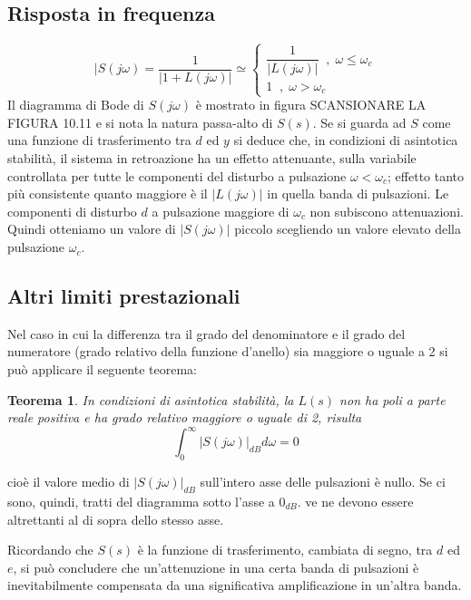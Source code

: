 \documentclass[a4paper]{report}
\newtheorem{teorema}{Teorema}
\begin{document}
\subsection{Risposta in frequenza}
\[
|S(j \omega) = \dfrac{1}{|1 + L(j \omega)|} \simeq
\left\{
\begin{array}{l}
  \dfrac{1}{|L(j \omega)|} \;\;,\; \omega \leq \omega_c\\
  1 \;\;,\; \omega > \omega_c
\end{array}
\right.
\]
Il diagramma di Bode di $S(j\omega)$ \`e mostrato in figura SCANSIONARE LA
FIGURA 10.11 e si nota la natura passa-alto di $S(s)$. Se si guarda ad
$S$ come una funzione di trasferimento tra $d$ ed $y$ si deduce che,
in condizioni di asintotica stabilit\`a, il sistema in retroazione
ha un effetto attenuante, sulla variabile controllata per tutte le
componenti del disturbo a pulsazione $\omega < \omega_c$; effetto
tanto pi\`u consistente quanto maggiore \`e il $|L(j \omega)|$ in
quella banda di pulsazioni. Le componenti di disturbo $d$ a pulsazione
maggiore di $\omega_c$ non subiscono attenuazioni. Quindi otteniamo un
valore di $|S(j \omega)|$ piccolo scegliendo un valore elevato della
pulsazione $\omega_c$. 
\subsection{Altri limiti prestazionali}
Nel caso in cui la differenza tra il grado del denominatore e il grado
del numeratore (grado relativo della funzione d'anello) sia
maggiore o uguale a 2 si pu\`o applicare il seguente teorema:
\begin{teorema}
  In condizioni di asintotica stabilit\`a, la $L(s)$ non ha poli a
  parte reale positiva e ha grado relativo maggiore o uguale di 2,
  risulta
  \[
  \int_{0}^{\infty} |S(j \omega)|_{dB} d\omega = 0
  \]
\end{teorema}
cio\`e il valore medio di $|S(j \omega)|_{dB}$ sull'intero asse delle
pulsazioni \`e nullo. Se ci sono, quindi, tratti del diagramma sotto
l'asse a $0_{dB}$. ve ne devono essere altrettanti al di sopra dello
stesso asse.

Ricordando che $S(s)$ \`e la funzione di trasferimento, cambiata di
segno, tra $d$ ed $e$, si pu\`o concludere che un'attenuzione in una
certa banda di pulsazioni \`e inevitabilmente compensata da una
significativa amplificazione in un'altra banda.
\end{document}
